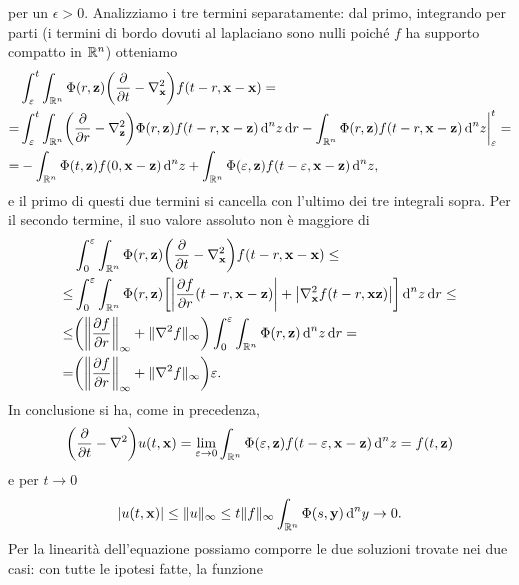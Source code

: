 per un $\epsilon>0$.
Analizziamo i tre termini separatamente: dal primo, integrando per parti (i termini di bordo dovuti al laplaciano sono nulli poich\'e $f$ ha supporto compatto in $\R^n$) otteniamo
\begin{equation}
    \begin{aligned}
        &\int_\epsilon^t\int_{\R^n}\sfc(r,\vec z)\biggl(\drp{}{t}-\lap_{\vec x}\biggr)f(t-r,\vec x-\vec x)=\\
        =&\int_\epsilon^t\int_{\R^n}\biggl(\drp{}{r}-\lap_{\vec z}\biggr)\sfc(r,\vec z)f(t-r,\vec x-\vec z)\,\dd^nz\,\dd r-\int_{\R^n}\sfc(r,\vec z)f(t-r,\vec x-\vec z)\,\dd^nz\bigg|_\epsilon^t=\\
        =&-\int_{\R^n}\sfc(t,\vec z)f(0,\vec x-\vec z)\,\dd^nz+\int_{\R^n}\sfc(\epsilon,\vec z)f(t-\epsilon,\vec x-\vec z)\,\dd^nz,
    \end{aligned}
\end{equation}
e il primo di questi due termini si cancella con l'ultimo dei tre integrali sopra.
Per il secondo termine, il suo valore assoluto non è maggiore di
\begin{equation}
    \begin{aligned}
        &\int_0^\epsilon\int_{\R^n}\sfc(r,\vec z)\biggl(\drp{}{t}-\lap_{\vec x}\biggr)f(t-r,\vec x-\vec x)\le\\
        \le&\int_0^\epsilon\int_{\R^n}\sfc(r,\vec z)\biggl[\abs[\bigg]{\drp{f}{r}(t-r,\vec x-\vec z)}+\abs[\big]{\lap_{\vec x}f(t-r,\vec x\vec z)}\biggr]\,\dd^nz\,\dd r\le\\
        \le&\biggl(\norm[\bigg]{\drp{f}{r}}_\infty+\norm{\lap f}_\infty\biggr)\int_0^\epsilon\int_{\R^n}\sfc(r,\vec z)\,\dd^nz\,\dd r=\\
        =&\biggl(\norm[\bigg]{\drp{f}{r}}_\infty+\norm{\lap f}_\infty\biggr)\epsilon.
    \end{aligned}
\end{equation}
In conclusione si ha, come in precedenza,
\begin{equation}
    \biggl(\drp{}{t}-\lap\biggr)u(t,\vec x)=
    \lim_{\epsilon\to 0}\int_{\R^n}\sfc(\epsilon,\vec z)f(t-\epsilon,\vec x-\vec z)\,\dd^nz=
    f(t,\vec z)
\end{equation}
e per $t\to 0$
\begin{equation}
    \abs{u(t,\vec x)}\le
    \norm{u}_\infty\le
    t\norm{f}_\infty\int_{\R^n}\sfc(s,\vec y)\,\dd^ny\to
    0.
\end{equation}
Per la linearità dell'equazione possiamo comporre le due soluzioni trovate nei due casi: con tutte le ipotesi fatte, la funzione
